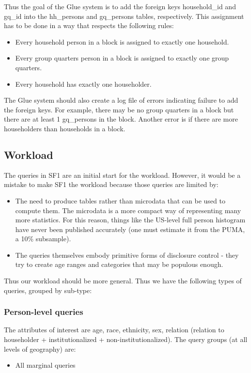 \documentclass{amsart}
\begin{document}
{Thus the goal of the Glue system is to add the foreign keys household\_id and gq\_id into the hh\_persons and gq\_persons tables, respectively. This assignment has to be done in a way that respects the following rules:
\begin{itemize}
\item Every household person in a block is assigned to exactly one household.
\item Every group quarters person in a block is assigned to exactly one group quarters.
\item Every household has exactly one householder.
\end{itemize}
The Glue system should also create a log file of errors indicating failure to add the foreign keys. For example, there may be no group quarters in a block but there are at least 1 gq\_persons in the block. Another error is if there are more householders than households in a block.



\subsection{Workload}\label{sec:milestone:workload}
The queries in SF1 are an initial start for the workload. However, it would be a mistake to make SF1 the workload because those queries are limited by:
\begin{itemize}
\item The need to produce tables rather than microdata that can be used to compute them. The microdata is a more compact way of representing many more statistics. For this reason, things like the US-level full person histogram have never been published accurately (one must estimate it from the PUMA, a 10\% subsample).
\item The queries themselves embody primitive forms of disclosure control - they try to create age ranges and categories that may be populous enough. 
\end{itemize}
Thus our workload should be more general. Thus we have the following types of queries, grouped by sub-type:
\subsubsection{Person-level queries}
The attributes of interest are age, race, ethnicity, sex, relation (relation to householder + institutionalized + non-institutionalized). The query groups (at all levels of geography) are:
\begin{itemize}
\item All marginal queries
\end{itemize}
}
\end{document}
